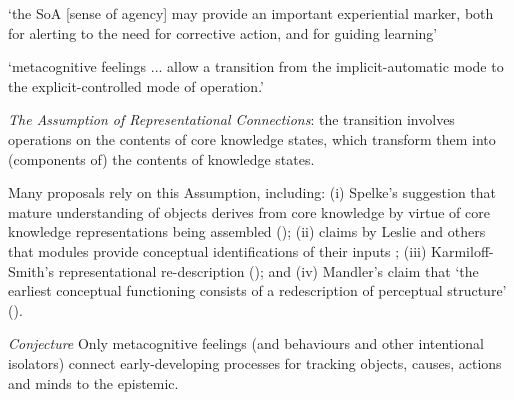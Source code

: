 \documentclass[12pt]{extarticle}
\begin{document}
\begin{multicols*}{3}
‘the SoA [sense of agency] may provide an important experiential marker, both for alerting to
the need for corrective action, and for guiding learning’
\citep[p.~11]{sidarus:2017_how}

‘metacognitive feelings ... allow a transition from the implicit-automatic mode to the
explicit-controlled mode of operation.’
\citep[p.~150]{koriat:2000_feeling}

\emph{The Assumption of Representational Connections}: the transition involves operations on the
contents of core knowledge states, which transform them into (components of) the contents of
knowledge states.

Many proposals rely on this Assumption, including:
(i) Spelke’s suggestion that mature understanding of objects derives from core knowledge by
virtue of core knowledge representations being assembled (\citeyear{Spelke:2000nf}); (ii) claims
by Leslie and others that modules provide conceptual identifications of their inputs
\citep{Leslie:1988ct}; (iii) Karmiloff-Smith’s representational re-description
(\citeyear{Karmiloff-Smith:1992lv}); and (iv) Mandler’s claim that ‘the earliest conceptual
functioning consists of a redescription of perceptual structure’ (\citeyear{Mandler:1992vn}).

\emph{Conjecture}
Only metacognitive feelings
(and behaviours and other intentional isolators)
connect early-developing processes for tracking objects, causes, actions and minds
to the epistemic.





\footnotesize


\end{multicols*}
\end{document}
